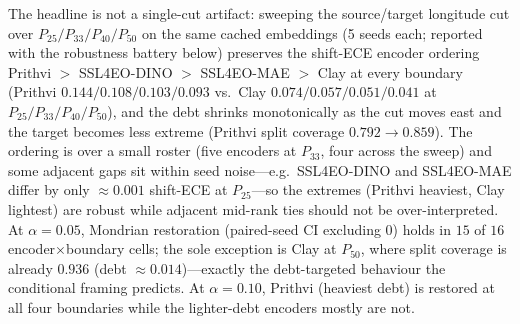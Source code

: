 \documentclass[preprint,11pt,authoryear]{elsarticle}
\begin{document}
The headline is not a single-cut artifact: sweeping the source/target
longitude cut over $P_{25}/P_{33}/P_{40}/P_{50}$ on the same cached embeddings (5 seeds each;
reported with the robustness battery below) preserves the shift-ECE encoder ordering Prithvi $>$ SSL4EO-DINO $>$ SSL4EO-MAE
$>$ Clay at every boundary (Prithvi $0.144/0.108/0.103/0.093$ vs.\ Clay $0.074/0.057/0.051/0.041$ at
$P_{25}/P_{33}/P_{40}/P_{50}$), and the debt shrinks monotonically as the cut moves east and the target
becomes less extreme (Prithvi split coverage $0.792\to0.859$). The ordering is over a small roster (five
encoders at $P_{33}$, four across the sweep) and some adjacent gaps sit within seed noise---e.g.\ SSL4EO-DINO
and SSL4EO-MAE differ by only ${\approx}0.001$ shift-ECE at $P_{25}$---so the extremes (Prithvi heaviest, Clay
lightest) are robust while adjacent mid-rank ties should not be over-interpreted. At $\alpha=0.05$, Mondrian restoration
(paired-seed CI excluding $0$) holds in $15$ of $16$ encoder$\times$boundary cells; the sole exception is
Clay at $P_{50}$, where split coverage is already $0.936$ (debt ${\approx}0.014$)---exactly the
debt-targeted behaviour the conditional framing predicts. At $\alpha=0.10$, Prithvi (heaviest debt) is
restored at all four boundaries while the lighter-debt encoders mostly are not.
\end{document}
